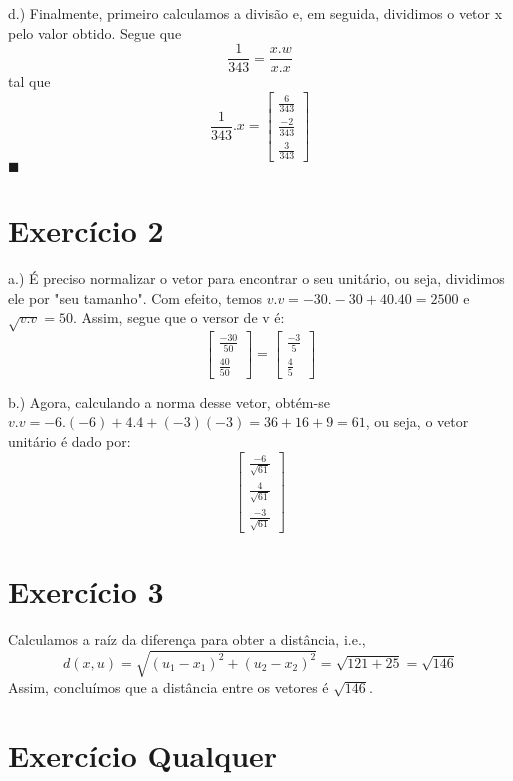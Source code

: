 \documentclass{article}
\renewcommand\qedsymbol{$\blacksquare$}
\begin{document}
  d.) Finalmente, primeiro calculamos a divis\~ao e, em seguida, dividimos o vetor x pelo valor obtido.
  Segue que
  $$
  \frac{1}{343} = \frac{x.w}{x.x}
  $$
  tal que 
  $$
  \frac{1}{343}.x = \begin{bmatrix}
    \frac{6}{343} \\
    \frac{-2}{343} \\
    \frac{3}{343}
  \end{bmatrix}
  $$ \qedsymbol
  
  \section*{Exerc\'icio 2}

  a.) \'E preciso normalizar o vetor para encontrar o seu unit\'ario, ou seja, dividimos ele por "seu tamanho". Com
  efeito, temos $v.v = -30.-30 + 40.40 = 2500$ e $\sqrt{v.v} = 50$. Assim, segue que o versor de v \'e:
  $$
  \begin{bmatrix}
    \frac{-30}{50} \\
    \frac{40}{50}
  \end{bmatrix} = 
  \begin{bmatrix}
    \frac{-3}{5}\\
    \frac{4}{5} 
  \end{bmatrix}
  $$

  b.) Agora, calculando a norma desse vetor, obt\'em-se $v.v = -6.(-6) + 4.4 + (-3)(-3) = 36 + 16 + 9 = 61$, ou seja,
o vetor unit\'ario \'e dado por:
  $$
  \begin{bmatrix}
    \frac{-6}{\sqrt{61}} \\
    \frac{4}{\sqrt{61}} \\
    \frac{-3}{\sqrt{61}}
  \end{bmatrix}
  $$

  \section*{Exerc\'icio 3}

  Calculamos a ra\'iz da diferen\c ca para obter a dist\^ancia, i.e., 
  $$
    d(x, u) = \sqrt{(u_1 - x_1)^2 + (u_2 - x_2)^2} = \sqrt{121 + 25} = \sqrt{146}
  $$
  Assim, conclu\'imos que a dist\^ancia entre os vetores \'e $\sqrt{146}$.

  \section*{Exerc\'icio Qualquer}
  
\end{document}
